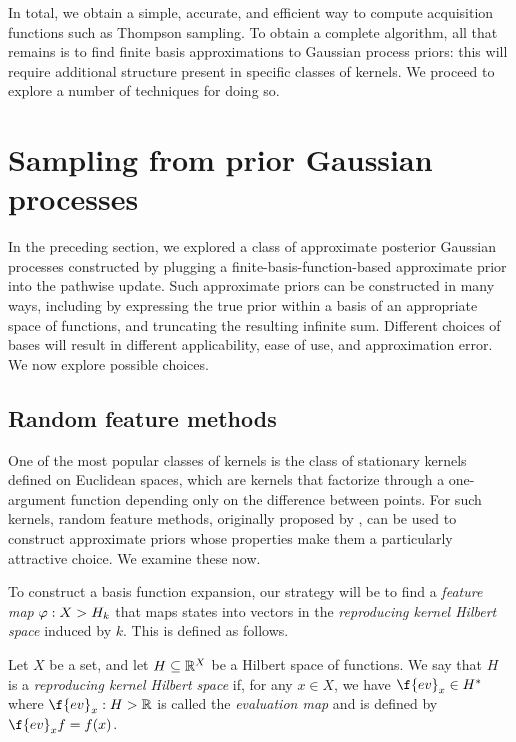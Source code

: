\documentclass[11pt]{book}
\begin{document}
In total, we obtain a simple, accurate, and efficient way to compute acquisition functions such as Thompson sampling.
To obtain a complete algorithm, all that remains is to find finite basis approximations to Gaussian process priors: this will require additional structure present in specific classes of kernels.
We proceed to explore a number of techniques for doing so.

\section{Sampling from prior Gaussian processes}

In the preceding section, we explored a class of approximate posterior Gaussian processes constructed by plugging a finite-basis-function-based approximate prior into the pathwise update.
Such approximate priors can be constructed in many ways, including by expressing the true prior within a basis of an appropriate space of functions, and truncating the resulting infinite sum.
Different choices of bases will result in different applicability, ease of use, and approximation error.
We now explore possible choices.


\subsection{Random feature methods}

One of the most popular classes of kernels is the class of stationary kernels defined on Euclidean spaces, which are kernels that factorize through a one-argument function depending only on the difference between points.
For such kernels, random feature methods, originally proposed by \textcite{rahimi08}, can be used to construct approximate priors whose properties make them a particularly attractive choice.
We examine these now.

To construct a basis function expansion, our strategy will be to find a \emph{feature map} $\varphi : X \-> H_k$ that maps states into vectors in the \emph{reproducing kernel Hilbert space} induced by $k$.
This is defined as follows.

\begin{definition}
Let $X$ be a set, and let $H \subseteq \mathbb{R}^X$ be a Hilbert space of functions. 
We say that $H$ is a \emph{reproducing kernel Hilbert space} if, for any $x\in X$, we have $\f{ev}_x \in H^*$ where $\f{ev}_x : H \-> \R$ is called the \emph{evaluation map} and is defined by $\f{ev}_x f = f(x)$.
\end{definition}
\end{document}
